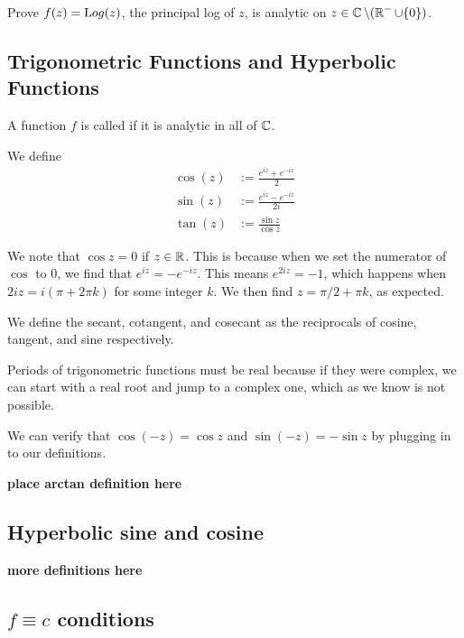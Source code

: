\documentclass[notes]{subfile}
\begin{document}
\begin{exercise}
    Prove $f(z) = {\text Log}(z)$, the principal log of $z$, is analytic on $z \in \operatorname{\mathbb{C}} \setminus (\operatorname{\mathbb{R}}^- \cup \{0\})$.
\end{exercise}

\subsection{Trigonometric Functions and Hyperbolic Functions}

\begin{definition}
    A function $f$ is called  if it is analytic in all of $\operatorname{\mathbb{C}}$.
\end{definition}

We define
\begin{align*}
    \cos (z) &:= \frac{e^{iz} + e^{-iz}}{2} \\
    \sin (z) &:= \frac{e^{iz} - e^{-iz}}{2i} \\
    \tan (z) &:= \frac{\sin z}{\cos z}
\end{align*}


\noindent 
We note that $\cos z = 0$ if $z \in \operatorname{\mathbb{R}}$.  This is because when we set the numerator of $\cos$ to $0$, we find
that $e^{iz} = -e^{-iz}$. 
This means $e^{2iz} = -1$, which happens when $2iz = i(\pi + 2\pi k)$ for some integer $k$.
We then find $z = \pi/2 + \pi k$, as expected.


\noindent
We define the secant, cotangent, and cosecant as the reciprocals of cosine, tangent, and sine respectively.

\noindent
Periods of trigonometric functions must be real because if they were complex, we can start with a real root and jump to a complex one, which as we know is not possible.

\noindent
We can verify that $\cos (-z) = \cos z$ and $\sin (-z) = -\sin z$ by plugging in to our definitions.

\begin{definition}
    \textbf{place arctan definition here}
\end{definition}

\subsection{Hyperbolic sine and cosine}
\textbf{more definitions here}

\subsection{$f \equiv c$ conditions}
\end{document}

